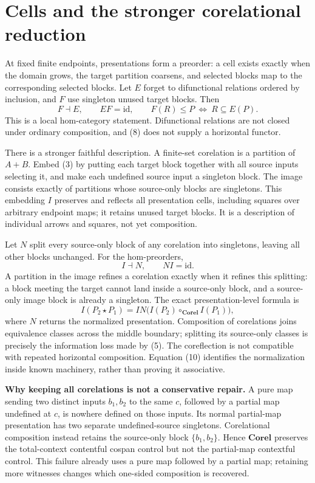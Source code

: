 \documentclass[11pt,a4paper]{article}
\newcommand{\Corel}{\mathbf{Corel}}
\newcommand{\id}{\mathrm{id}}
\begin{document}
\section{Cells and the stronger corelational reduction}

At fixed finite endpoints, presentations form a preorder: a cell exists exactly
when the domain grows, the target partition coarsens, and selected blocks map
to the corresponding selected blocks. Let \(E\) forget to difunctional
relations ordered by inclusion, and \(F\) use singleton unused target blocks.
Then
\[
 F\dashv E,\qquad EF=\id,
 \qquad F(R)\leq P\ \Longleftrightarrow\ R\subseteq E(P).
 \tag{8}
\]
This is a local hom-category statement. Difunctional relations are not closed
under ordinary composition, and (8) does not supply a horizontal functor.

There is a stronger faithful description. A finite-set corelation is a partition
of \(A+B\). Embed (3) by putting each target block together with all source
inputs selecting it, and make each undefined source input a singleton block.
The image consists exactly of partitions whose source-only blocks are
singletons. This embedding \(I\) preserves and reflects all presentation cells,
including squares over arbitrary endpoint maps; it retains unused target blocks.
It is a description of individual arrows and squares, not yet composition.

Let \(N\) split every source-only block of any corelation into singletons,
leaving all other blocks unchanged. For the hom-preorders,
\[
 I\dashv N,\qquad NI=\id.
 \tag{9}
\]
A partition in the image refines a corelation exactly when it refines this
splitting: a block meeting the target cannot land inside a source-only block,
and a source-only image block is already a singleton.
The exact presentation-level formula is
\[
 I(P_2\star P_1)=IN\bigl(I(P_2)\circ_{\Corel}I(P_1)\bigr),
 \tag{10}
\]
where \(N\) returns the normalized presentation. Composition of
corelations joins equivalence classes across the middle boundary; splitting its
source-only classes is precisely the information loss made by (5).
The coreflection is not compatible with repeated horizontal composition.
Equation (10) identifies the normalization inside known machinery, rather than
proving it associative.

\textbf{Why keeping all corelations is not a conservative repair.}
A pure map sending two distinct inputs \(b_1,b_2\) to the same \(c\), followed
by a partial map undefined at \(c\), is nowhere defined on those inputs.
Its normal partial-map presentation has two separate undefined-source
singletons. Corelational composition instead retains the source-only block
\(\{b_1,b_2\}\). Hence \(\Corel\) preserves the total-context contentful
cospan control but not the partial-map contextful control. This failure already
uses a pure map followed by a partial map; retaining more witnesses changes
which one-sided composition is recovered.
\end{document}
